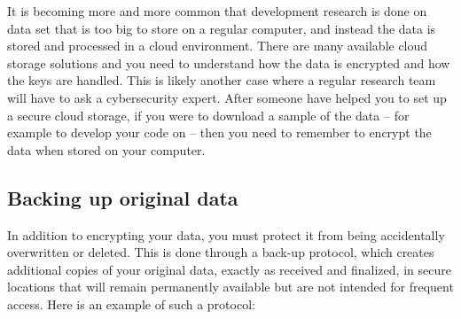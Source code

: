 \documentclass[
]{book}
\begin{document}
It is becoming more and more common that development research
is done on data set that is too big to store on a regular computer,
and instead the data is stored and processed in a cloud environment.
There are many available cloud storage solutions
and you need to understand how the data is encrypted and how the keys are handled.
This is likely another case where a regular research team will have to ask a cybersecurity expert.
After someone have helped you to set up a secure cloud storage,
if you were to download a sample of the data --
for example to develop your code on --
then you need to remember to encrypt the data when stored on your computer.

\hypertarget{backing-up-original-data}{%
\subsection*{Backing up original data}\label{backing-up-original-data}}

In addition to encrypting your data, you must protect it
from being accidentally overwritten or deleted.
This is done through a back-up protocol,
which creates additional copies of your original data,
exactly as received and finalized,
in secure locations that will remain permanently available
but are not intended for frequent access.
Here is an example of such a protocol:
\end{document}
